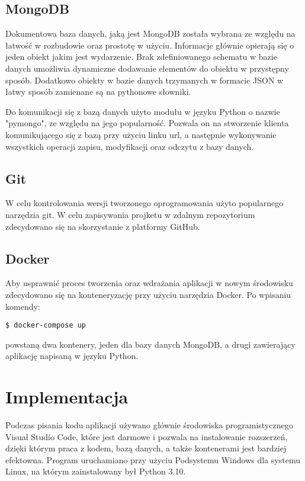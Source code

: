 \documentclass[12pt,a4paper]{article}
\begin{document}
\subsection{MongoDB}

Dokumentowa baza danych, jaką jest MongoDB została wybrana ze względu na łatwość w rozbudowie oraz prostotę w użyciu. Informacje głównie opierają się o jeden obiekt jakim jest wydarzenie. Brak zdefiniowanego schematu w bazie danych umożliwia dynamiczne dodawanie elementów do obiektu w przystępny sposób. Dodatkowo obiekty w bazie danych trzymanych w formacie JSON w łatwy sposób zamienane są na pythonowe słowniki.

Do komunikacji się z bazą danych użyto modułu w języku Python o nazwie "pymongo", ze względu na jego popularność. Pozwala on na stworzenie klienta komunikującego się z bazą przy użyciu linku url, a następnie wykonywanie wszystkich operacji zapisu, modyfikacji oraz odczytu z bazy danych.

\subsection{Git}

W celu kontrolowania wersji tworzonego oprogramowania użyto popularnego narzędzia git. W celu zapisywania projketu w zdalnym repozytorium zdecydowano się na skorzystanie z platformy GitHub.

\subsection{Docker}

Aby usprawnić proces tworzenia oraz wdrażania aplikacji w nowym środowisku zdecydowano się na konteneryzację przy użyciu narzędzia Docker. Po wpisaniu komendy:
\begin{lstlisting}[]
  $ docker-compose up
\end{lstlisting}
powstaną dwa kontenery, jeden dla bazy danych MongoDB, a drugi zawierający aplikację napisaną w języku Python.



\section{Implementacja}

Podczas pisania kodu aplikacji używano głównie środowiska programistycznego Visual Studio Code, które jest darmowe i pozwala na instalowanie rozszerzeń, dzięki którym praca z kodem, bazą danych, a także kontenerami jest bardziej efektowna. Program uruchamiano przy użyciu Podsystemu Windows dla systemu Linux, na którym zainstalowany był Python 3.10.
\end{document}
